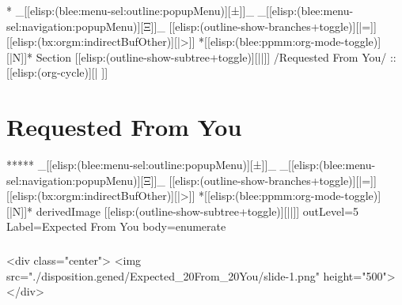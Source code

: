 
\begin{whenOrg}
*  _[[elisp:(blee:menu-sel:outline:popupMenu)][±]]_ _[[elisp:(blee:menu-sel:navigation:popupMenu)][Ξ]]_ [[elisp:(outline-show-branches+toggle)][|=]] [[elisp:(bx:orgm:indirectBufOther)][|>]] *[[elisp:(blee:ppmm:org-mode-toggle)][|N]]*  Section    [[elisp:(outline-show-subtree+toggle)][||]]   /Requested From You/ ::  [[elisp:(org-cycle)][| ]]
\end{whenOrg}

\section{Requested From You}


\begin{whenOrg}
*****  _[[elisp:(blee:menu-sel:outline:popupMenu)][±]]_ _[[elisp:(blee:menu-sel:navigation:popupMenu)][Ξ]]_ [[elisp:(outline-show-branches+toggle)][|=]] [[elisp:(bx:orgm:indirectBufOther)][|>]] *[[elisp:(blee:ppmm:org-mode-toggle)][|N]]*  derivedImage [[elisp:(outline-show-subtree+toggle)][||]] outLevel=5 Label=Expected From You  body=enumerate
\end{whenOrg}

\begin{htmlonly}

\begin{frame}[fragile,plain,label=Expected From You]
    \frametitle{}
    \framesubtitle{}
    \begin{rawhtml}
<div class="center">
<img src="./disposition.gened/Expected_20From_20You/slide-1.png" height="500">
</div>
    \end{rawhtml}
\end{frame}
\end{htmlonly}

